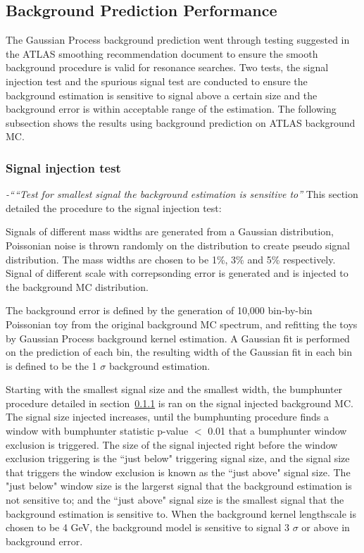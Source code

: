 
\subsection{Background Prediction Performance}
The Gaussian Process background prediction went through testing suggested in the ATLAS smoothing recommendation document to ensure the smooth background procedure is valid for resonance searches. Two tests, the signal injection test and the spurious signal test are conducted to ensure the background estimation is sensitive to signal above a certain size and the background error is within acceptable range of the estimation. The following subsection shows the results using background prediction on ATLAS background MC.  

\subsubsection{Signal injection test} 
\textit{-``“Test for smallest signal the background estimation is sensitive to”}
This section detailed the procedure to the signal injection test: 

Signals of different mass widths are generated from a Gaussian distribution, Poissonian noise is thrown randomly on the distribution to create pseudo signal distribution. The mass widths are chosen to be 1\%, 3\% and 5\% respectively. Signal of different scale with correpsonding error is generated and is injected to the background MC distribution.

The background error is defined by the generation of 10,000 bin-by-bin Poissonian toy from the original background MC spectrum, and refitting the toys by Gaussian Process background kernel estimation. A Gaussian fit is performed on the prediction of each bin, the resulting width of the Gaussian fit in each bin is defined to be the 1 $\sigma$ background estimation. 

Starting with the smallest signal size and the smallest width, the bumphunter procedure detailed in section~\ref{} is ran on the signal injected background MC. The signal size injected increases, until the bumphunting procedure finds a window with bumphunter statistic p-value $<$ 0.01 that a bumphunter window exclusion is triggered. The size of the signal injected right before the window exclusion triggering is the ``just below"
triggering signal size, and the signal size that triggers the window exclusion is known as the ``just above" signal size. The "just below"
window size is the largerst signal that the background estimation is not sensitive to; and the ``just above" signal size is the smallest signal that the background estimation is sensitive to. When the background kernel lengthscale is chosen to be 4 GeV, the background model is sensitive to signal 3 $\sigma$ or above in background error. 

